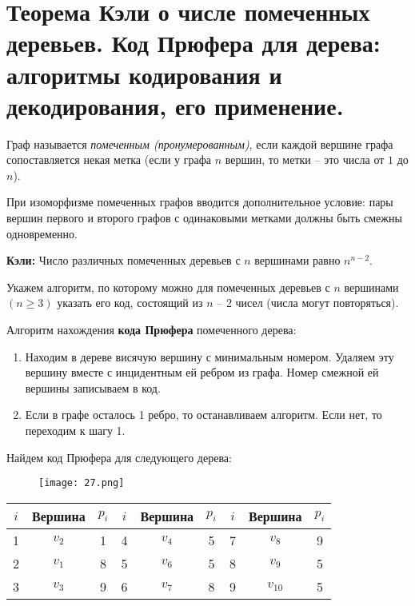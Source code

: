 \section{Теорема Кэли о числе помеченных деревьев. Код Прюфера для дерева: алгоритмы кодирования и 
декодирования, его применение.}

\begin{definition}
    Граф называется \textit{помеченным (пронумерованным)}, если каждой
    вершине графа сопоставляется некая метка (если у графа $n$ вершин, то метки
    -- это числа от $1$ до $n$).
\end{definition}

При изоморфизме помеченных графов вводится дополнительное условие:
пары вершин первого и второго графов с одинаковыми метками должны быть
смежны одновременно.

\begin{theorem}
    \textbf{Кэли:} Число различных помеченных деревьев с $n$ вершинами равно
    $n^{n-2}$.
\end{theorem}

Укажем алгоритм, по которому можно для помеченных деревьев с $n$
вершинами $(n \geq 3)$ указать его код, состоящий из $n$ -- 2 чисел (числа могут
повторяться).

Алгоритм нахождения \textbf{кода Прюфера} помеченного дерева:

\begin{enumerate}[left=0.0em, labelsep=1em, topsep=0.0em, itemsep=0pt, parsep=0.5em]
    \item Находим в дереве висячую вершину с минимальным номером.
    Удаляем эту вершину вместе с инцидентным ей ребром из графа. Номер
    смежной ей вершины записываем в код.
    \item Если в графе осталось 1 ребро, то останавливаем алгоритм. Если нет,
    то переходим к шагу 1.
\end{enumerate}

Найдем код Прюфера для следующего дерева:
\begin{figure}[h]
    \centering
    \texttt{[image: 27.png]}
\end{figure}

\begin{table}[h!]
    \centering
    \begin{tabular}{|c|c|c||c|c|c||c|c|c|}
    \hline
    $i$ & Вершина & $p_i$ & $i$ & Вершина & $p_i$ & $i$ & Вершина & $p_i$ \\
    \hline
    1 & $v_2$ & 1 & 4 & $v_4$ & 5 & 7 & $v_8$ & 9 \\
    2 & $v_1$ & 8 & 5 & $v_6$ & 5 & 8 & $v_9$ & 5 \\
    3 & $v_3$ & 9 & 6 & $v_7$ & 8 & 9 & $v_{10}$ & 5 \\
    \hline
    \end{tabular}
\end{table}

